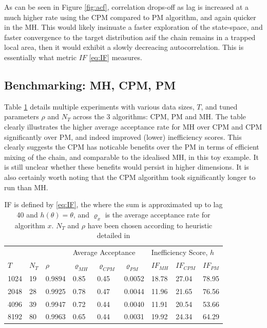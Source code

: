 \documentclass{article}
\begin{document}
As can be seen in Figure \ref{fig:acf}, correlation drops-off as lag is increased at a much higher rate using the CPM compared to PM algorithm, and again quicker in the MH. This would likely insinuate a faster exploration of the state-space, and faster convergence to the target distribution asif the chain remains in a trapped local area, then it would exhibit a slowly decreacing autocorrelation. This is essentially what metric $IF$ \eqref{eq:IF} measures.

\subsection{Benchmarking: MH, CPM, PM}

Table \ref{tab:table} details multiple experiments with various data sizes, $T$, and tuned parameters $\rho$ and $N_T$ across the 3 algorithms: CPM, PM and MH. The table clearly illustrates the higher average acceptance rate for MH over CPM and CPM significantly over PM, and indeed improved (lower) inefficiency scores. This clearly suggests the CPM has noticable benefits over the PM in terms of efficient mixing of the chain, and comparable to the idealised MH, in this toy example. It is still unclear whether these benefits would persist in higher dimensions. It is also certainly worth noting that the CPM algorithm took significantly longer to run than MH.

\begin{table}[H]
\begin{tabular}{|l|ll|lll|lll|}
\hline
     & \multicolumn{2}{l|}{} & \multicolumn{3}{l|}{Average Acceptance}           & \multicolumn{3}{l|}{Inefficiency Score, $h$} \\
$T$  & $N_T$     & $\rho$    & $\varrho_{MH}$ & $\varrho_{CPM}$ & $\varrho_{PM}$ & $IF_{MH}$     & $IF_{CPM}$    & $IF_{PM}$    \\ \hline
1024 & 19        & 0.9894    & 0.85           & 0.45            & 0.0052         & 18.78         & 27.04         & 78.95        \\
2048 & 28        & 0.9925    & 0.78           & 0.47            & 0.0044         & 11.96         & 21.65         & 76.56        \\
4096 & 39        & 0.9947    & 0.72          & 0.44            & 0.0040         & 11.91         & 20.54         & 53.66        \\
8192 & 80        & 0.9963    & 0.65           & 0.44            & 0.0031         & 19.92         & 24.34         & 64.29        \\ \hline
\end{tabular}
\caption{IF is defined by \eqref{eq:IF}, the where the sum is approximated up to lag 40 and $h(\theta)=\theta$, and $\varrho_{x}$ is the average acceptance rate for algorithm $x$. $N_T$ and $\rho$ have been chosen according to heuristic detailed in \cite{cpmmDeligiannidis2015}}
\label{tab:table}
\end{table}
\end{document}
